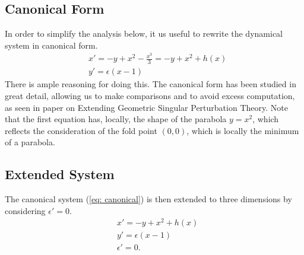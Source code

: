 \subsection{Canonical Form}
In order to simplify the analysis below, it us useful to rewrite the dynamical system in canonical form.
\begin{equation}
    \begin{aligned}
        &x'=-y+x^2-\frac{x^3}{3}=-y+x^2+h(x) \\
        &y'=\epsilon(x-1)
    \end{aligned}
    \label{eq: canonical}
\end{equation}
There is ample reasoning for doing this. The canonical form has been studied in great detail, allowing us to make comparisons and to avoid excess computation, as seen in \citet{krupa2001} paper on Extending Geometric Singular Perturbation Theory.  Note that the first equation has, locally, the shape of the parabola $y= x^2$, which reflects the consideration of the fold point $(0,0)$, which is locally the minimum of a parabola.


\subsection{Extended System}
The canonical system (\ref{eq: canonical}) is then extended to three dimensions by considering $\epsilon'=0$. 
\begin{equation} \label{extended FS}
    \begin{aligned}
        &x'=-y+x^2+h(x) \\
        &y'=\epsilon(x-1)\\
        &\epsilon'=0.
    \end{aligned}
\end{equation}


